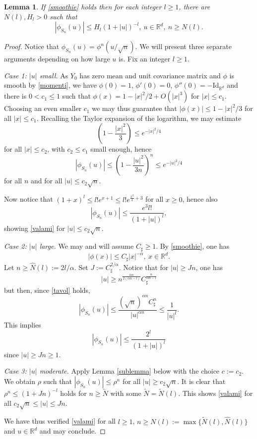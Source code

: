 \documentclass{article}
\newtheorem{lemma}[theorem]{Lemma}
\begin{document}
\begin{lemma}\label{bundi} If \eqref{smoothie} holds then
for each integer $l\geq 1$, there are $N(l),H_{l}>0$ such that
\begin{equation}\label{valami}
|\phi_{S_{n}}(u)|\leq H_{l}(1+|u|)^{-l},\ u\in\mathbb{R}^{d},\ n\geq N(l).
\end{equation}
\end{lemma}
\begin{proof}
Notice that $\phi_{S_{n}}(u)=\phi^{n}(u/\sqrt{n})$. We will present three separate arguments
depending on how large $u$ is. Fix an integer $l\geq 1$.

\smallskip

\noindent\textsl{Case 1: $|u|$ small.} As $Y_{0}$ has zero mean and unit covariance matrix and $\phi$ is smooth
by \eqref{momenti}, we have $\phi(0)=1$, $\phi'(0)=0$, $\phi''(0)=-\mathrm{Id}_{\mathbb{R}^{d}}$ 
and there is $0<c_{1}\leq 1$ such that 
$\phi(x)=1-|x|^{2}/2+O(|x|^{3})$ for $|x|\leq c_{1}$. Choosing an even smaller $c_{1}$ we may thus
guarantee that $|\phi(x)|\leq 1-|x|^{2}/3$ for all $|x|\leq c_{1}$. Recalling the Taylor expansion
of the logarithm, we may estimate 
$$
\left(1-\frac{|x|^{2}}{3}\right)\leq e^{-|x|^{2}/4}
$$
for all $|x|\leq c_{2}$, with $c_{2}\leq c_{1}$ small enough, hence
$$
|\phi_{S_{n}}(u)|\leq \left(1-\frac{|u|^{2}}{3n}\right)^{n}\leq e^{-|u|^{2}/4}
$$
for all $n$ and for all $|u|\leq c_{2}\sqrt{n}$.

Now notice that $(1+x)^{l}\leq l!e^{x+1}\leq l! e^{\frac{x^{2}}{4} +3}$ for all $x\geq 0$,
hence also 
$$
|\phi_{S_{n}}(u)|\leq \frac{e^{3}l!}{(1+|u|)^{l}},
$$
showing \eqref{valami} for $|u|\leq c_{2}\sqrt{n}$.

\smallskip{}

\noindent\textsl{Case 2: $|u|$ large.} We may and will assume $C_{\sharp}\geq 1$. By \eqref{smoothie}, one has 
\begin{equation}\label{tavol}
|\phi(x)|\leq C_{\sharp}|x|^{-\alpha},\ x\in\mathbb{R}^{d}.	
\end{equation} 
Let $n\geq \hat{N}(l):=2l/\alpha$. 
Set $J:=C_{\sharp}^{2/\alpha}$. Notice that for $|u|\geq Jn$, one has
$$
|u|\geq n^{\frac{\alpha n}{2(\alpha n -l)}}C_{\sharp}^{\frac{n}{\alpha n-l}}
$$
but then, since \eqref{tavol} holds,
$$
|\phi_{S_{n}}(u)|\leq \frac{(\sqrt{n})^{\alpha n}C_{\sharp}^{n}}{|u|^{\alpha n} }\leq \frac{1}{|u|^{l}}.
$$
This implies 
$$
|\phi_{S_{n}}(u)|\leq \frac{2^{l}}{(1+|u|)^{l}}
$$
since $|u|\geq Jn\geq 1$.

\smallskip{}


\noindent\textsl{Case 3: $|u|$ moderate.}
Apply Lemma \ref{sublemma} below
with the choice $c:=c_{2}$. We obtain $\rho$ such that $|\phi_{S_{n}}(u)|\leq \rho^{n}$
for all $|u|\geq c_{2}\sqrt{n}$. 
It is clear that $\rho^{n}\leq (1+Jn)^{-l}$ holds for $n\geq \tilde{N}$ with some 
$\tilde{N}=\tilde{N}(l)$.
This shows \eqref{valami} for all $c_{2}\sqrt{n}\leq |u|\leq Jn$.

\smallskip


We have thus verified \eqref{valami} for all $l\geq 1$, $n\geq N(l):=\max\{\tilde{N}(l),\hat{N}(l)\}$ 
and $u\in\mathbb{R}^{d}$ and may conclude. 
\end{proof} 
\end{document}
